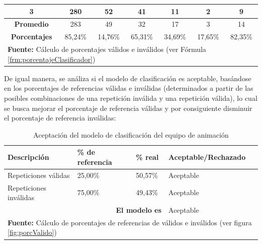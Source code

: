 \begin{table}[H]
\begin{center}
\begin{tabular}{|c|c|c|c|c|c|c|}
3                    & 280                                                                   & 52                                                             & 41                                               & 11                                                & 2                                                                      & 9                                                                      \\ \hline
\textbf{Promedio}    & 283                                                                   & 49                                                             & 32                                               & 17                                                & 3                                                                      & 14                                                                     \\ \hline
\textbf{Porcentajes} & 85,24\%                                                               & 14,76\%                                                        & 65,31\%                                          & 34,69\%                                           & 17,65\%                                                                & 82,35\%                                                                \\ \hline
\multicolumn{7}{l}{\textbf{Fuente:} C\'alculo de porcentajes v\'alidos e inv\'alidos (ver F\'ormula \ref{frm:porcentajeClasificador})}
\end{tabular}
\end{center}
\end{table}
De igual manera, se an\'aliza si el modelo de clasificaci\'on es aceptable, bas\'andose en los porcentajes de referencias v\'alidas e inv\'alidas (determinados a partir de las posibles combinaciones de una repetici\'on inv\'alida y una repetici\'on v\'alida), lo cual se busca mejorar el porcentaje de referencia v\'alidas y por  consiguiente disminuir el porcentaje de referencia inv\'alidas:
\begin{table}[H]
\begin{center}
\caption{Aceptaci\'on del modelo de clasificaci\'on del equipo de animaci\'on}
\label{tab:acModAni}
\begin{tabular}{|l|l|l|l|}
\hline
\textbf{Descripci\'on} & \textbf{\% de referencia} & \textbf{\% real} & \textbf{Aceptable/Rechazado} \\ \hline
Repeticiones v\'alidas              & 25,00\%                   & 50,57\%          & Aceptable                    \\ \hline
Repeticiones inv\'alidas            & 75,00\%                   & 49,43\%          & Aceptable                    \\ \hline
\multicolumn{3}{|r|}{\textbf{El modelo es}}                         & Aceptable                    \\ \hline 
\multicolumn{4}{l}{\textbf{Fuente:} C\'alculo de porcentajes de referencias de v\'alidos e inv\'alidos (ver figura  \ref{fig:porcValido})}
\end{tabular}
\end{center}
\end{table}
